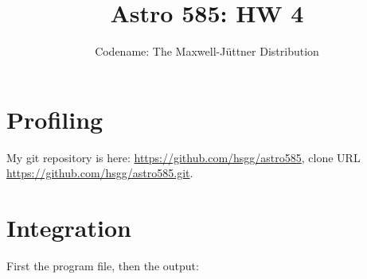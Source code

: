 \documentclass[11pt]{article}
\title{Astro 585: HW 4}
\author{Codename: The Maxwell-Jüttner Distribution}
\begin{document}
\maketitle

\section{Profiling}
My git repository is here: \url{https://github.com/hsgg/astro585}, clone URL
\url{https://github.com/hsgg/astro585.git}.

\section{Integration}
First the program file, then the output:

\end{document}
